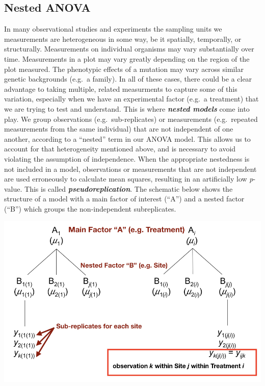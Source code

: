 \documentclass[
]{book}
\begin{document}
\hypertarget{nested-anova}{%
\subsection{Nested ANOVA}\label{nested-anova}}

In many observational studies and experiments the sampling units we measurements are heterogeneous in some way, be it spatially, temporally, or structurally. Measurements on individual organisms may vary substantially over time. Measurements in a plot may vary greatly depending on the region of the plot measured. The phenotypic effects of a mutation may vary across similar genetic backgrounds (e.g.~a family). In all of these cases, there could be a clear advantage to taking multiple, related measurments to capture some of this variation, especially when we have an experimental factor (e.g.~a treatment) that we are trying to test and understand. This is where \textbf{\emph{nested models}} come into play. We group observations (e.g.~sub-replicates) or measurements (e.g.~repeated measurements from the same individual) that are not independent of one another, according to a ``nested'' term in our ANOVA model. This allows us to account for that heterogeneity mentioned above, and is necessary to avoid violating the assumption of independence. When the appropriate nestedness is not included in a model, observations or measurements that are not independent are used erroneously to calculate mean squares, resulting in an artificially low \emph{p}-value. This is called \textbf{\emph{pseudoreplication}}. The schematic below shows the structure of a model with a main factor of interest (``A'') and a nested factor (``B'') which groups the non-independent subreplicates.

\begin{center}\includegraphics[width=0.9\linewidth]{images/images_7a.005} \end{center}
\end{document}
